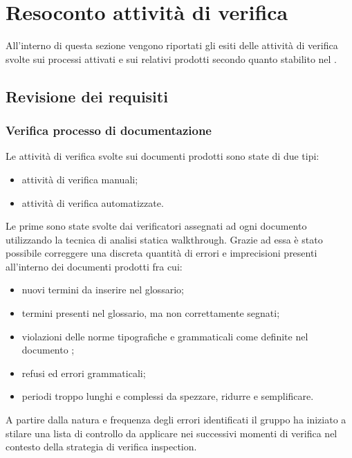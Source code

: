 	
\section{Resoconto attività di verifica}
All'interno di questa sezione vengono riportati gli esiti delle attività di verifica svolte sui processi attivati e sui relativi prodotti secondo quanto stabilito nel \PdP.
	\subsection{Revisione dei requisiti}
		\subsubsection{Verifica processo di documentazione}
		Le attività di verifica svolte sui documenti prodotti sono state di due tipi:
		\begin{itemize}		
			\item attività di verifica manuali;
			\item attività di verifica automatizzate.
		\end{itemize}
		
		Le prime sono state svolte dai verificatori assegnati ad ogni documento utilizzando la tecnica di 					analisi statica walkthrough. Grazie ad essa è stato possibile correggere una discreta quantità di errori e imprecisioni presenti all'interno dei documenti prodotti fra cui: 
		\begin{itemize}	
			\item nuovi termini da inserire nel glossario;
			\item termini presenti nel glossario, ma non correttamente segnati;
			\item violazioni delle norme tipografiche e grammaticali come definite nel documento \NdP ;
			\item refusi ed errori grammaticali;
			\item periodi troppo lunghi e complessi da spezzare, ridurre e semplificare.
		\end{itemize}
		A partire dalla natura e frequenza degli errori identificati il gruppo ha iniziato a stilare una lista
		di controllo da applicare nei successivi momenti di verifica nel contesto della strategia di verifica
		inspection.

